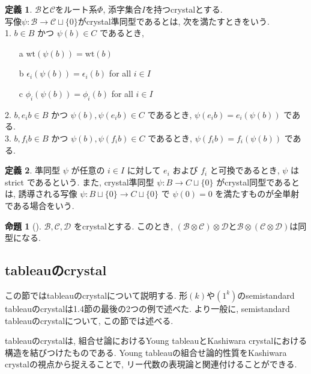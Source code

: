 \documentclass[
  a4paper, 
  12pt,
  ja=standard,
  xelatex,
  left=30truemm,
  right=30truemm,
  titlepage 
]{bxjsarticle}
\theoremstyle{definition}
\newtheorem{df}{定義}
\newtheorem{prop}[thm]{命題}
\begin{document}
\begin{df}  
  $\mathscr{B}$と$\mathscr{C}$をルート系$\Phi$, 添字集合$I$を持つcrystalとする. \\
  写像$ \psi : \mathscr{B} \to \mathscr{C} \sqcup \{ 0 \}$がcrystal準同型であるとは, 次を満たすときをいう. \\
  1. $b \in B$ かつ $\psi(b) \in C$ であるとき, 
    \begin{enumerate}
      \item[a] $\mathrm{wt}(\psi(b)) = \mathrm{wt}(b)$
      \item[b] $\epsilon_i(\psi(b)) = \epsilon_i(b)$ \quad for all $i \in I$
      \item[c]$\phi_i(\psi(b)) = \phi_i(b)$ \quad for all $i \in I$
    \end{enumerate}
  2. $b, e_i b \in B$ かつ $\psi(b), \psi(e_i b) \in C$ であるとき, $\psi(e_i b) = e_i(\psi(b))$ である. \\
  3. $b, f_i b \in B$ かつ $\psi(b), \psi(f_i b) \in C$ であるとき, $\psi(f_i b) = f_i(\psi(b))$ である.
\end{df}

\begin{df}
  準同型 $\psi$ が任意の $i \in I$ に対して $e_i$ および $f_i$ と可換であるとき, $\psi$ は strict であるという.
  また, crystal準同型 $\psi : B \to C \sqcup \{ 0 \}$ がcrystal同型であるとは, 誘導される写像 $\psi : B \sqcup \{ 0 \} \to C \sqcup \{ 0 \}$ で $\psi(0) = 0$ を満たすものが全単射である場合をいう.
\end{df}

\begin{prop} [{\cite[命題2.32]{b1}}] 
  $\mathscr{B}, \mathscr{C}, \mathscr{D}$ をcrystalとする.
  このとき, $(\mathscr{B} \otimes \mathscr{C}) \otimes \mathscr{D}$と$\mathscr{B} \otimes (\mathscr{C} \otimes \mathscr{D})$は同型になる. 
\end{prop}

%
\subsection{tableauのcrystal}
  この節ではtableauのcrystalについて説明する. 形$(k)$や$(1^k)$のsemistandard tableauのcrystalは1.4節の最後の2つの例で述べた.
  より一般に, semistandard tableauのcrystalについて, この節では述べる.

  tableauのcrystalは, 組合せ論におけるYoung tableauとKashiwara crystalにおける構造を結びつけたものである.
  Young tableauの組合せ論的性質をKashiwara crystalの視点から捉えることで, リー代数の表現論と関連付けることができる.
  \\
  
\end{document}

